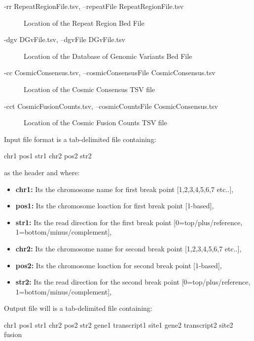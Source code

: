 \documentclass[letterpaper,10pt,english]{sphinxmanual}
\begin{document}
\begin{description}
\begin{description}
\item[{-rr RepeatRegionFile.tsv, --repeatFile RepeatRegionFile.tsv}] \leavevmode
Location of the Repeat Region Bed File

\item[{-dgv DGvFile.tsv, --dgvFile DGvFile.tsv}] \leavevmode
Location of the Database of Genomic Variants Bed File

\item[{-cc CosmicConsensus.tsv, --cosmicConsensusFile CosmicConsensus.tsv}] \leavevmode
Location of the Cosmic Consensus TSV file

\item[{-cct CosmicFusionCounts.tsv, --cosmicCountsFile CosmicConsensus.tsv}] \leavevmode
Location of the Cosmic Fusion Counts TSV file

\end{description}

\end{description}

Input file format is a tab-delimited file containing:

chr1  pos1  str1  chr2  pos2  str2

as the header and where:
\begin{itemize}
\item {} 
\textbf{chr1:} Its the chromosome name for first break point {[}1,2,3,4,5,6,7 etc..{]},

\item {} 
\textbf{pos1:} Its the chromosome loaction for first break point {[}1-based{]},

\item {} 
\textbf{str1:} Its the read direction for the first break point {[}0=top/plus/reference, 1=bottom/minus/complement{]},

\item {} 
\textbf{chr2:} Its the chromosome name for second break point {[}1,2,3,4,5,6,7 etc..{]},

\item {} 
\textbf{pos2:} Its the chromosome loaction for second break point {[}1-based{]},

\item {} 
\textbf{str2:} Its the read direction for the second break point {[}0=top/plus/reference, 1=bottom/minus/complement{]},

\end{itemize}

Output file will is a tab-delimited file containing:

chr1  pos1  str1  chr2  pos2  str2  gene1 transcript1 site1 gene2 transcript2 site2 fusion
\end{document}
